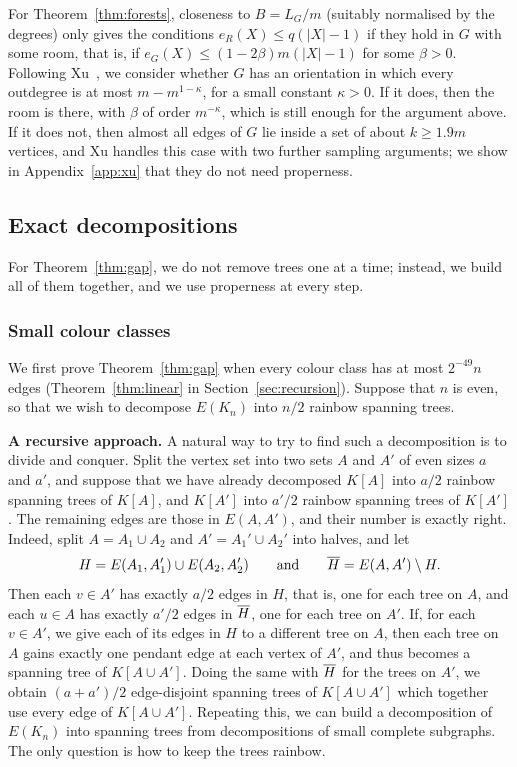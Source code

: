 For Theorem~\ref{thm:forests}, closeness to $B=L_G/m$ (suitably normalised by the degrees) only gives the conditions $e_R(X)\le q(|X|-1)$ if they hold in $G$ with some room, that is, if $e_G(X)\le(1-2\beta)m(|X|-1)$ for some $\beta>0$.
Following Xu~\cite{Xu}, we consider whether $G$ has an orientation in which every outdegree is at most $m-m^{1-\kappa}$, for a small constant $\kappa>0$.
If it does, then the room is there, with $\beta$ of order $m^{-\kappa}$, which is still enough for the argument above.
If it does not, then almost all edges of $G$ lie inside a set of about $k\ge1.9m$ vertices, and Xu handles this case with two further sampling arguments; we show in Appendix~\ref{app:xu} that they do not need properness.

\subsection{Exact decompositions}\label{sec:sketch-exact}
For Theorem~\ref{thm:gap}, we do not remove trees one at a time; instead, we build all of them together, and we use properness at every step.
\subsubsection{Small colour classes}\label{sec:sketch-linear}
We first prove Theorem~\ref{thm:gap} when every colour class has at most $2^{-49}n$ edges (Theorem~\ref{thm:linear} in Section~\ref{sec:recursion}).
Suppose that $n$ is even, so that we wish to decompose $E(K_n)$ into $n/2$ rainbow spanning trees.

\smallskip

\noindent\textbf{A recursive approach.}
A natural way to try to find such a decomposition is to divide and conquer.
Split the vertex set into two sets $A$ and $A'$ of even sizes $a$ and $a'$, and suppose that we have already decomposed $K[A]$ into $a/2$ rainbow spanning trees of $K[A]$, and $K[A']$ into $a'/2$ rainbow spanning trees of $K[A']$.
The remaining edges are those in $E(A,A')$, and their number is exactly right.
Indeed, split $A=A_1\cup A_2$ and $A'=A_1'\cup A_2'$ into halves, and let
\[
H=E(A_1,A_1')\cup E(A_2,A_2')\qquad\text{and}\qquad \overline{H}=E(A,A')\setminus H.
\]
Then each $v\in A'$ has exactly $a/2$ edges in $H$, that is, one for each tree on $A$, and each $u\in A$ has exactly $a'/2$ edges in $\overline{H}$, one for each tree on $A'$.
If, for each $v\in A'$, we give each of its edges in $H$ to a different tree on $A$, then each tree on $A$ gains exactly one pendant edge at each vertex of $A'$, and thus becomes a spanning tree of $K[A\cup A']$.
Doing the same with $\overline{H}$ for the trees on $A'$, we obtain $(a+a')/2$ edge-disjoint spanning trees of $K[A\cup A']$ which together use every edge of $K[A\cup A']$.
Repeating this, we can build a decomposition of $E(K_n)$ into spanning trees from decompositions of small complete subgraphs.
The only question is how to keep the trees rainbow.

